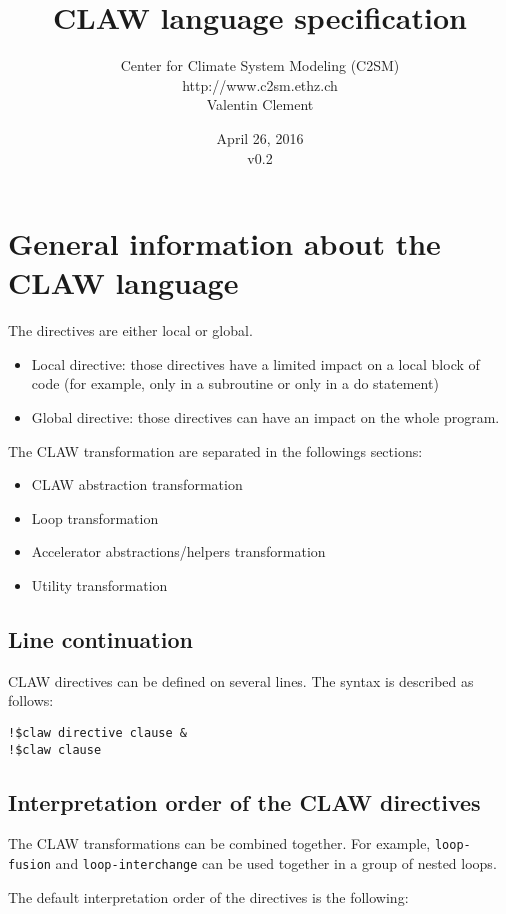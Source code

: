 \documentclass{article}
\title{CLAW language specification}
\author{Center for Climate System Modeling (C2SM)\\http://www.c2sm.ethz.ch\\Valentin Clement}
\date{April 26, 2016\\\vspace{1em}v0.2}
\begin{document}
\maketitle


\tableofcontents

\section{General information about the CLAW language}
The directives are either local or global.

\begin{itemize}
\item Local directive: those directives have a limited impact on a local block of
code (for example, only in a subroutine or only in a do statement)
\item Global directive: those directives can have an impact on the whole
program.
\end{itemize}

The CLAW transformation are separated in the followings sections:
\begin{itemize}
\item CLAW abstraction transformation
\item Loop transformation
\item Accelerator abstractions/helpers transformation
\item Utility transformation
\end{itemize}

\subsection{Line continuation}
CLAW directives can be defined on several lines. The syntax is described as follows:

\begin{lstlisting}
!$claw directive clause &
!$claw clause
\end{lstlisting}


\subsection{Interpretation order of the CLAW directives}
The CLAW transformations can be combined together. For example, \lstinline!loop-fusion! and \lstinline!loop-interchange! can be used together in a group of nested loops.

The default interpretation order of the directives is the following:
\end{document}
